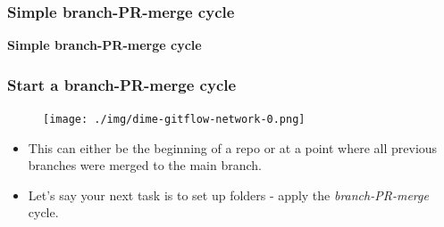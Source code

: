 \documentclass[aspectratio=169]{beamer}
\begin{document}
\begin{frame}
	\frametitle{Simple branch-PR-merge cycle}

	\huge\centering \textbf{Simple branch-PR-merge cycle}

\end{frame}


\begin{frame}
	\frametitle{Start a branch-PR-merge cycle}

	\vspace{-.5cm}
	\begin{minipage}[t][5cm][t]{\textwidth}
		\begin{figure}
			\centering
			\texttt{[image: ./img/dime-gitflow-network-0.png]}
		\end{figure}
	\end{minipage}

	\vspace{-.5cm}
	\begin{minipage}[t][5cm][t]{\textwidth}
		\begin{itemize}
			\setlength\itemsep{.5em}
			\item This can either be the beginning of a repo
			or at a point where all previous branches were merged
			to the main branch.
			\item Let's say your next task is to set up folders
			- apply the \textit{branch-PR-merge} cycle.
		\end{itemize}
	\end{minipage}

\end{frame}
\end{document}
